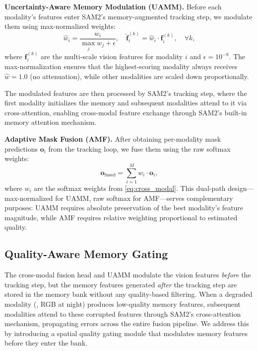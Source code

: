 \noindent\textbf{Uncertainty-Aware Memory Modulation (UAMM).}
Before each modality's features enter SAM2's memory-augmented tracking step, we modulate them using max-normalized weights:
\begin{equation}
  \hat{w}_i = \frac{w_i}{\max_{j} w_j + \epsilon},
  \quad \hat{\mathbf{f}}_i^{(k)} = \hat{w}_i \cdot \mathbf{f}_i^{(k)}, \quad \forall k,
  \label{eq:uamm}
\end{equation}
where $\mathbf{f}_i^{(k)}$ are the multi-scale vision features for modality $i$ and $\epsilon = 10^{-8}$.
The max-normalization ensures that the highest-scoring modality always receives $\hat{w} = 1.0$ (no attenuation), while other modalities are scaled down proportionally.

The modulated features are then processed by SAM2's tracking step, where the first modality initializes the memory and subsequent modalities attend to it via cross-attention, enabling cross-modal feature exchange through SAM2's built-in memory attention mechanism.

\noindent\textbf{Adaptive Mask Fusion (AMF).}
After obtaining per-modality mask predictions $\mathbf{o}_i$ from the tracking loop, we fuse them using the raw softmax weights:
\begin{equation}
  \mathbf{o}_\text{fused} = \sum_{i=1}^{M} w_i \cdot \mathbf{o}_i,
  \label{eq:amf}
\end{equation}
where $w_i$ are the softmax weights from \cref{eq:cross_modal}.
This dual-path design---max-normalized for UAMM, raw softmax for AMF---serves complementary purposes: UAMM requires absolute preservation of the best modality's feature magnitude, while AMF requires relative weighting proportional to estimated quality.


\subsection{Quality-Aware Memory Gating}
\label{sec:quality_gating}

The cross-modal fusion head and UAMM modulate the vision features \emph{before} the tracking step, but the memory features generated \emph{after} the tracking step are stored in the memory bank without any quality-based filtering.
When a degraded modality (\eg, RGB at night) produces low-quality memory features, subsequent modalities attend to these corrupted features through SAM2's cross-attention mechanism, propagating errors across the entire fusion pipeline.
We address this by introducing a spatial quality gating module that modulates memory features before they enter the bank.

